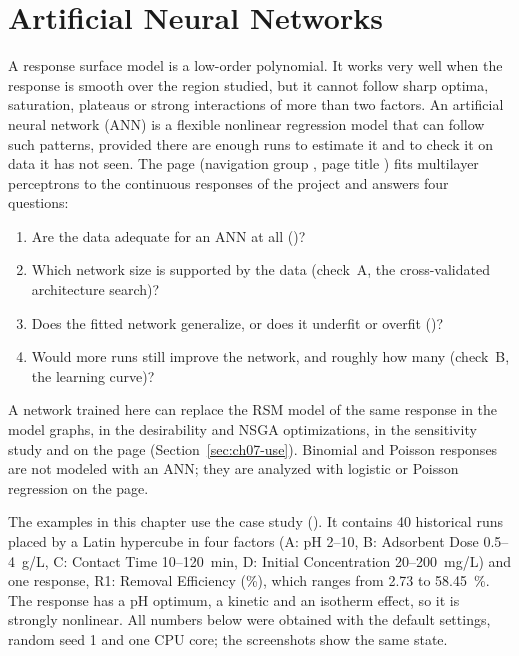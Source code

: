 \chapter{Artificial Neural Networks}\label{sec:ch07-ann}\label{chap:7}

A response surface model is a low-order polynomial. It works very well when the response is smooth over the
region studied, but it cannot follow sharp optima, saturation, plateaus or strong interactions of more than two
factors. An artificial neural network (ANN) is a flexible nonlinear regression model that can follow such
patterns, provided there are enough runs to estimate it and to check it on data it has not seen. The
 page (navigation group , page title ) fits multilayer
perceptrons to the continuous responses of the project and answers four questions:
\begin{enumerate}
  \item Are the data adequate for an ANN at all ()?
  \item Which network size is supported by the data (check~A, the cross-validated architecture search)?
  \item Does the fitted network generalize, or does it underfit or overfit ()?
  \item Would more runs still improve the network, and roughly how many (check~B, the learning curve)?
\end{enumerate}
A network trained here can replace the RSM model of the same response in the model graphs, in the desirability and
NSGA optimizations, in the sensitivity study and on the  page
(Section~\ref{sec:ch07-use}). Binomial and Poisson responses are not modeled with an ANN; they are analyzed with
logistic or Poisson regression on the  page.

The examples in this chapter use the case study  (). It contains 40 historical runs placed by a Latin hypercube in four factors (A: pH 2--10,
B: Adsorbent Dose 0.5--4~g/L, C: Contact Time 10--120~min, D: Initial Concentration 20--200~mg/L) and one
response, R1: Removal Efficiency (\%), which ranges from 2.73 to 58.45~\%. The response has a pH optimum, a
kinetic and an isotherm effect, so it is strongly nonlinear. All numbers below were obtained with the default
settings, random seed 1 and one CPU core; the screenshots show the same state.

